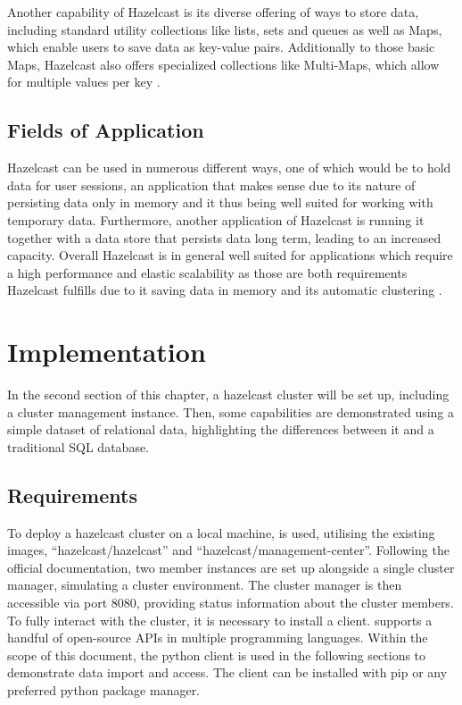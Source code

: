 Another capability of Hazelcast is its diverse offering of ways to store data, including standard utility collections like lists, sets and queues as well as Maps, which enable users to save data as key-value pairs. Additionally to those basic Maps, Hazelcast also offers  
specialized collections like Multi-Maps, which allow for multiple values per key \parencite{Johns.2015}.
\subsection{Fields of Application} \label{subsec:fieldsOfApplicationHazelcast}

Hazelcast can be used in numerous different ways, one of which would be to hold data for user sessions, an application that makes sense due to its nature 
of persisting data only in memory and it thus being well suited for working with temporary data. Furthermore, another application of Hazelcast is 
running it together with a data store that persists data long term, leading to an increased capacity. Overall Hazelcast is in general well 
suited for applications which require a high performance and elastic scalability as those are both requirements Hazelcast fulfills due to it saving data in memory and 
its automatic clustering \parencite{Johns.2015}. 


\section{Implementation} \label{sec:implementationHazelcast}

In the second section of this chapter, a hazelcast cluster will be set up, including a cluster management 
instance. Then, some capabilities are demonstrated using a simple dataset of relational data, highlighting 
the differences between it and a traditional SQL database.

\subsection{Requirements} \label{subsec:requirementsHazelcast}

To deploy a hazelcast cluster on a local machine, \textcite{Hazelcast.Docker.Hazelcast, Hazelcast.Docker.ManagementCenter} is used, utilising the existing images, 
\enquote{hazelcast/hazelcast}  and \enquote{hazelcast/management-center}. 
Following the official documentation, two member instances are set up alongside a single cluster manager, 
simulating a cluster environment. The cluster manager is then accessible via port 8080, providing status 
information about the cluster members. To fully interact with the cluster, it is necessary to install a 
client. \textcite{Hazelcast.Clients} supports a handful of open-source APIs in multiple programming languages. 
Within the scope of this document, the python client is 
used in the following sections to demonstrate data import and access. The client can be installed with pip 
or any preferred python package manager.

